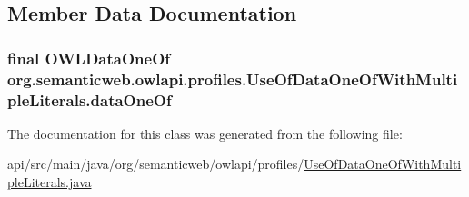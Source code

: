 \subsection{Member Data Documentation}
\hypertarget{classorg_1_1semanticweb_1_1owlapi_1_1profiles_1_1_use_of_data_one_of_with_multiple_literals_a01f6608663d31efed21fe838724acfa3}{
\subsubsection[{data\-One\-Of}]{\setlength{\rightskip}{0pt plus 5cm}final {\bf O\-W\-L\-Data\-One\-Of} org.\-semanticweb.\-owlapi.\-profiles.\-Use\-Of\-Data\-One\-Of\-With\-Multiple\-Literals.\-data\-One\-Of\hspace{0.3cm}{\ttfamily [private]}}}\label{classorg_1_1semanticweb_1_1owlapi_1_1profiles_1_1_use_of_data_one_of_with_multiple_literals_a01f6608663d31efed21fe838724acfa3}


The documentation for this class was generated from the following file\-:\begin{DoxyCompactItemize}
\item 
api/src/main/java/org/semanticweb/owlapi/profiles/\hyperlink{_use_of_data_one_of_with_multiple_literals_8java}{Use\-Of\-Data\-One\-Of\-With\-Multiple\-Literals.\-java}\end{DoxyCompactItemize}
